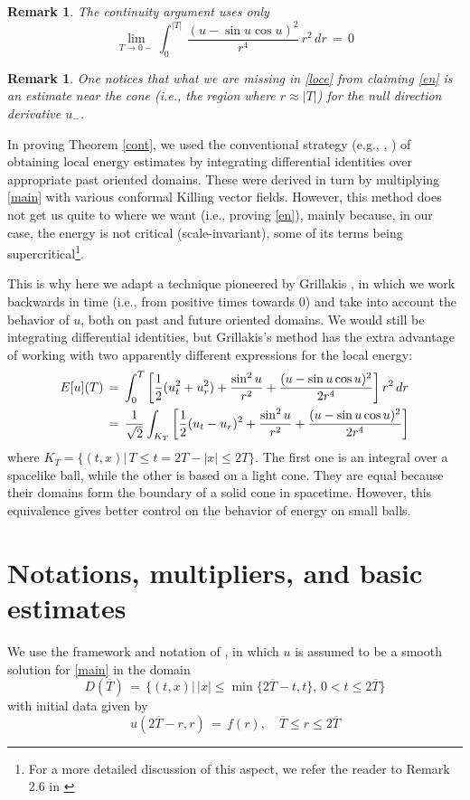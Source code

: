 \documentclass{amsart}
\newtheorem{remark}[theorem]{Remark}
\begin{document}
\begin{remark}
The continuity argument uses only
\[
\lim_{T\to 0-} \int_0^{|
T|}\,\frac{(u-\sin
u \cos u)^2}{r^4}\, r^2 \,dr \,=\, 0\]
\end{remark}

\begin{remark}
One notices that what we are missing in \eqref{loce} from claiming \eqref{en} is an estimate near the cone (i.e., the region where $r \approx |T|$) for the null direction derivative $u_-$.
\end{remark}

In proving Theorem \ref{cont}, we used the conventional strategy (e.g., \cite{SZ1}, \cite{MR1223662}) of obtaining local energy estimates by integrating differential identities  over appropriate past oriented domains. These were derived in turn by multiplying \eqref{main} with various conformal Killing vector fields. However, this method
does not get us quite to where we want (i.e., proving \eqref{en}), mainly because, in our case, the energy is not critical (scale-invariant), some of its terms being supercritical\footnote{For a more detailed discussion of this aspect, we refer the reader to Remark 2.6 in \cite{GR1}}.

This is why here we adapt a technique pioneered by Grillakis \cite{G}, in which we work backwards in time (i.e., from positive times towards $0$) and take into account the behavior of $u$, both on past and future oriented domains. We would still be integrating differential identities, but Grillakis's method has the extra advantage of working with two apparently different expressions for the local energy:
\begin{equation}\aligned
E[u](T)\,&=\, \int_0^{
T}\left[\frac{1}{2}(u_t^2+u_r^2)+\frac{\sin^2u}{r^2}+\frac{(u-\sin
u \cos u)^2}{2r^4}\right] r^2\,dr\\
\,&=\, \frac{1}{\sqrt{2}}\int_{
K_T}\left[\frac{1}{2}(u_t-u_r)^2+\frac{\sin^2u}{r^2}+\frac{(u-\sin
u \cos u)^2}{2r^4}\right]
\endaligned
\label{equiv}
\end{equation}
where $K_T=\{(t,x)|\, T\leq t = 2T-|x|\leq 2T\}$. The first one is an integral over a spacelike ball, while the other is based on a light cone. They are equal because their domains form the boundary of a solid cone in spacetime. However, this equivalence gives better control on the behavior of energy on small balls.

\section{Notations, multipliers, and basic estimates}
We use the framework and notation of \cite{G}, in which $u$ is assumed to be a smooth solution for \eqref{main} in the domain
\begin{equation}
D(\overline{T})\,=\,\{(t,x)|\, |x|\leq\min\{2\overline{T}-t,t\},\,
0< t\leq 2\overline{T}\} \label{dom}
\end{equation}
with initial data given by
\begin{equation}
u(2\overline{T}-r,r)\,=\,f(r), \quad \overline{T}\leq r \leq
2\overline{T} \label{inidata}
\end{equation}
\end{document}
